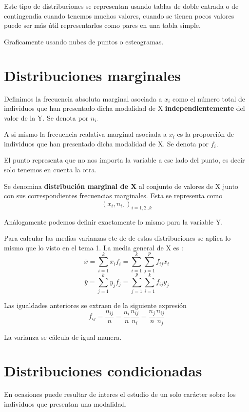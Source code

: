 \documentclass{article}
\begin{document}
 Este tipo de distribuciones se representan usando tablas de doble entrada o de contingendia cuando tenemos muchos valores, cuando se tienen pocos valores puede ser más útil representarlos como pares en una tabla simple.
 \vspace{5cm}
 
Graficamente usando nubes de puntos o esteogramas. 

\section{Distribuciones marginales}

	Definimos la frecuencia absoluta marginal asociada a $x_i$ como el número total de individuos que han presentado dicha modalidad de X \textbf{independientemente} del valor de la Y. Se denota por $n_{i \cdot }$
	
	A si mismo la frecuencia realativa marginal asociada a $x_i$ es la proporción de individuos que han presentado dicha modalidad de X. Se denota por $f_{i\cdot}$
	
	El punto representa que no nos importa la variable a ese lado del punto, es decir solo tenemos en cuenta la otra.
	
	Se denomina \textbf{ distribución marginal de X} al conjunto de valores de X junto con sus correspondientes frecuencias marginales. Esta se representa como $$(x_i,n_{i\cdot})_{i = 1,2..k}$$
	
	Análogamente podemos definir exactamente lo mismo para la variable Y.
	
	Para calcular las medias varianzas etc de de estas distribuciones se aplica lo mismo que lo visto en el tema 1.
	La media general de X es : $$ \overline{x} = \sum_{i=1}^k x_i f_i =\sum_{i=1}^{k} \sum_{j=1}^{p} f_{ij} x_i$$
	$$ \overline{y} = \sum_{j=1}^k y_j f_j =\sum_{j=1}^{p} \sum_{i=1}^{k} f_{ij} y_j$$
	
	Las igualdades anteriores se extraen de la siguiente expresión $$f_{ij} = \frac{n_{ij}}{n} = \frac{n_i}{n} \frac{n_{ij}} {n_i} = \frac{n_j}{n} \frac{n_{ij}}{n_j} $$
	
	La varianza se cálcula de igual manera.

\section{Distribuciones condicionadas}

	En ocasiones puede resultar de interes el estudio de un solo carácter sobre los individuos que presentan una modalidad.
	
\end{document}
